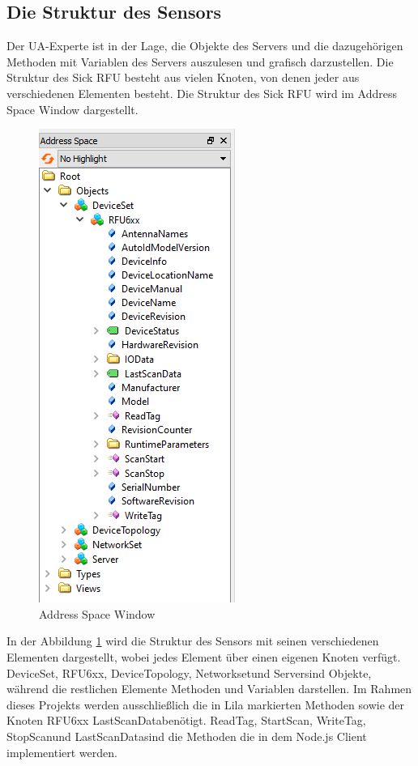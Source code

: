 \subsection{Die Struktur des Sensors}

Der UA-Experte ist in der Lage, die Objekte des Servers und die dazugehörigen Methoden mit Variablen des Servers auszulesen und grafisch darzustellen. Die Struktur des Sick RFU besteht aus vielen Knoten, von denen jeder aus verschiedenen Elementen besteht. Die Struktur des Sick RFU wird im Address Space Window dargestellt.\\

\begin{figure}[htp]
    \centering
    \includegraphics[width=(\textwidth/3)]{Bild/Address_Space.PNG}
    \caption{Address Space Window}
    \label{fig:Address Space Window}
\end{figure}

In der Abbildung \ref{fig:Address Space Window} wird die Struktur des Sensors mit seinen verschiedenen Elementen dargestellt, wobei jedes Element über einen eigenen Knoten verfügt. 
\frqq DeviceSet\flqq, \frqq RFU6xx\flqq, \frqq DeviceTopology\flqq, \frqq Networkset\flqq und \frqq Server\flqq sind Objekte, während die restlichen Elemente Methoden und Variablen darstellen. 
Im Rahmen dieses Projekts werden ausschließlich die in Lila markierten Methoden sowie der Knoten RFU6xx \frqq LastScanData\flqq benötigt. 
\frqq ReadTag\flqq, \frqq StartScan\flqq, \frqq WriteTag\flqq, \frqq StopScan\flqq und \frqq LastScanData\flqq sind die Methoden die in dem Node.js Client implementiert werden.


